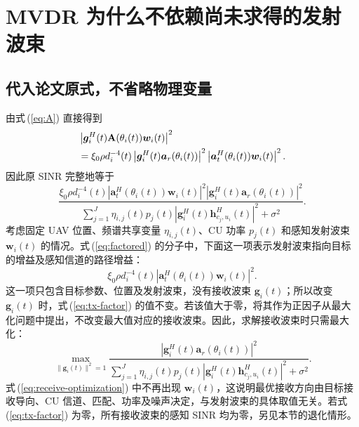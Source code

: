 \documentclass[11pt,a4paper]{ctexart}
\begin{document}
\section{MVDR 为什么不依赖尚未求得的发射波束}
\subsection{代入论文原式，不省略物理变量}
由式\,(\ref{eq:A}) 直接得到
\begin{align}
&\left|\bm g_i^H(t)\mathbf A(\theta_i(t))\bm w_i(t)\right|^2\notag\\
&=\xi_0\rho d_i^{-4}(t)
\left|\bm g_i^H(t)\bm a_r(\theta_i(t))\right|^2
\left|\bm a_t^H(\theta_i(t))\bm w_i(t)\right|^2.\label{eq:factor}
\end{align}
因此原 SINR 完整地等于
\begin{equation}\label{eq:factored}
\frac{\xi_0\rho d_i^{-4}(t)
\left|\bm a_t^H(\theta_i(t))\bm w_i(t)\right|^2
\left|\bm g_i^H(t)\bm a_r(\theta_i(t))\right|^2}
{\displaystyle\sum_{j=1}^J\eta_{i,j}(t)p_j(t)
\left|\bm g_i^H(t)\bm h_{c_j,u_i}^{H}(t)\right|^2+\sigma^2}.
\end{equation}
考虑固定 UAV 位置、频谱共享变量 $\eta_{i,j}(t)$、CU 功率 $p_j(t)$ 和感知发射波束 $\bm w_i(t)$ 的情况。式\,(\ref{eq:factored}) 的分子中，下面这一项表示发射波束指向目标的增益及感知信道的路径增益：
\begin{equation}\label{eq:tx-factor}
\xi_0\rho d_i^{-4}(t)
\left|\bm a_t^H(\theta_i(t))\bm w_i(t)\right|^2.
\end{equation}
这一项只包含目标参数、位置及发射波束，没有接收波束 $\bm g_i(t)$；所以改变 $\bm g_i(t)$ 时，式\,(\ref{eq:tx-factor}) 的值不变。若该值大于零，将其作为正因子从最大化问题中提出，不改变最大值对应的接收波束。因此，求解接收波束时只需最大化：
\begin{equation}\label{eq:receive-optimization}
\max_{\|\bm g_i(t)\|^2=1}
\frac{\left|\bm g_i^H(t)\bm a_r(\theta_i(t))\right|^2}
{\displaystyle\sum_{j=1}^J\eta_{i,j}(t)p_j(t)
\left|\bm g_i^H(t)\bm h_{c_j,u_i}^{H}(t)\right|^2+\sigma^2}.
\end{equation}
式\,(\ref{eq:receive-optimization}) 中不再出现 $\bm w_i(t)$，这说明最优接收方向由目标接收导向、CU 信道、匹配、功率及噪声决定，与发射波束的具体取值无关。若式\,(\ref{eq:tx-factor}) 为零，所有接收波束的感知 SINR 均为零，另见本节的退化情形。
\end{document}
